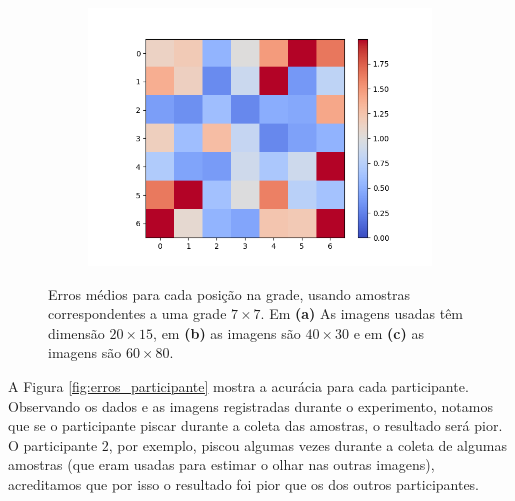 \begin{figure}
    \begin{subfigure}[b]{0.4\textwidth}
        \centering
        \includegraphics[scale=.4]{imagens/erros3pyrDown.png}
        \caption{}
    \end{subfigure}
        
    \caption{Erros médios para cada posição na grade, usando amostras correspondentes a uma grade $7 \times 7$. Em {\bf (a)} As imagens usadas têm dimensão $20 \times 15$, em {\bf (b)} as imagens são $40 \times 30$ e em {\bf (c)} as imagens são $60 \times 80$.}
    \label{fig:erros_posicao}
\end{figure}

A Figura \ref{fig:erros_participante} mostra a acurácia para cada participante. Observando os dados e as imagens registradas durante o experimento, notamos que se o participante piscar durante a coleta das amostras, o resultado será pior. O participante $2$, por exemplo, piscou algumas vezes durante a coleta de algumas amostras (que eram usadas para estimar o olhar nas outras imagens), acreditamos que por isso o resultado foi pior que os dos outros participantes.

